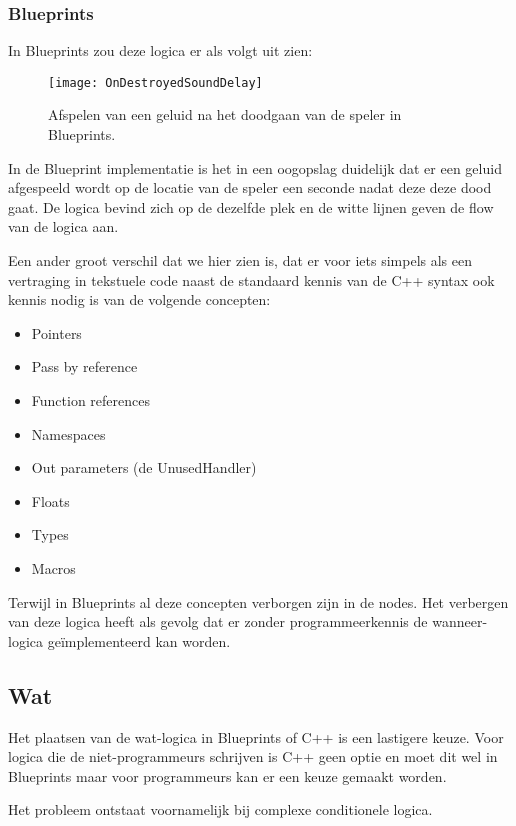 \subsubsection{Blueprints}
In Blueprints zou deze logica er als volgt uit zien:

\begin{figure}[!ht]
  \centering
    \texttt{[image: OnDestroyedSoundDelay]}
    \caption{Afspelen van een geluid na het doodgaan van de speler in Blueprints.}
\end{figure}

In de Blueprint implementatie is het in een oogopslag duidelijk dat er een geluid afgespeeld wordt op de locatie van de speler een seconde nadat deze deze dood gaat. De logica bevind zich op de dezelfde plek en de witte lijnen geven de flow van de logica aan. 

Een ander groot verschil dat we hier zien is, dat er voor iets simpels als een vertraging in tekstuele code naast de standaard kennis van de C++ syntax ook kennis nodig is van de volgende concepten:

\begin{itemize}
	\item Pointers
	\item Pass by reference
	\item Function references
	\item Namespaces
	\item Out parameters (de UnusedHandler)
	\item Floats
	\item Types
	\item Macros 
\end{itemize}

Terwijl in Blueprints al deze concepten verborgen zijn in de nodes. Het verbergen van deze logica heeft als gevolg dat er zonder programmeerkennis de wanneer-logica geïmplementeerd kan worden.

\subsection{Wat}

Het plaatsen van de wat-logica in Blueprints of C++ is een lastigere keuze. Voor logica die de niet-programmeurs schrijven is C++ geen optie en moet dit wel in Blueprints maar voor programmeurs kan er een keuze gemaakt worden.

Het probleem ontstaat voornamelijk bij complexe conditionele logica.

